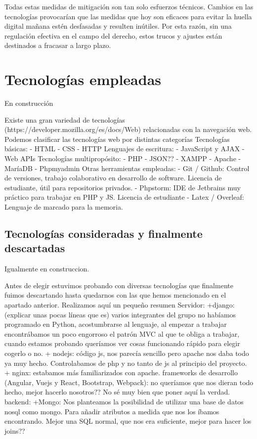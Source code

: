 Todas estas medidas de mitigación son tan solo esfuerzos técnicos. Cambios en las tecnologías provocarían que las medidas que hoy son eficaces para evitar la huella digital mañana estén desfasadas y resulten inútiles. Por esta razón, sin una regulación efectiva en el campo del derecho, estos trucos y ajustes están destinados a fracasar a largo plazo.  \par 

\section{Tecnologías empleadas}
En construcción \par

Existe una gran variedad de tecnologías (https://developer.mozilla.org/es/docs/Web) relacionadas con la navegación web. Podemos clasificar las tecnologías web por distintas categorías 
Tecnologías básicas: 
-	HTML
-	CSS
-	HTTP
Lenguajes de escritura:
-	JavaScript y AJAX
-	Web APIs
Tecnologías multipropósito:
-	PHP
-	JSON??
-	XAMPP
-		Apache
-		MaríaDB
-		Phpmyadmin
Otras herramientas empleadas: 
-	Git / Github: Control de versiones, trabajo colaborativo en desarrollo de software. Licencia de estudiante, útil para repositorios privados.
-	Phpstorm: IDE de Jetbrains muy práctico para trabajar en PHP y JS. Licencia de estudiante
-	Latex / Overleaf: Lenguaje de marcado para la memoria.

\subsection{Tecnologías consideradas y finalmente descartadas}
Igualmente en construccion. \par

Antes de elegir estuvimos probando con diversas tecnologías que finalmente fuimos descartando hasta quedarnos con las que hemos mencionado en el apartado anterior. Realizamos aquí un pequeño resumen
Servidor:
+django: (explicar unas pocas líneas que es)
varios integrantes del grupo no habíamos programado en Python, acostumbrarse al lenguaje, al empezar a trabajar encontrábamos un poco engorroso el patrón MVC al que te obliga a trabajar, cuando estamos probando queríamos ver cosas funcionando rápido para elegir cogerlo o no.
+ nodejs: código js, nos parecía sencillo pero apache nos daba todo ya muy hecho. Controlabamos de php y no tanto de js al principio del proyecto.
+ nginx: estabamos más familiarizados con apache.
frameworks de desarrollo (Angular, Vuejs y React, Bootstrap, Webpack): no queríamos que nos dieran todo hecho, mejor hacerlo nosotros?? No sé muy bien que poner aquí la verdad.
backend:
+Mongo: Nos planteamos la posibilidad de utilizar una base de datos nosql como mongo. Para añadir atributos a medida que nos los íbamos encontrando. Mejor una SQL normal, que nos era suficiente, mejor para hacer los joins??


